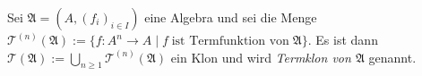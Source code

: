 \begin{definition}
    Sei $\mathfrak{A} = (A, (f_i)_{i \in I})$ eine Algebra und sei die Menge $\mathcal{T}^{(n)}(\mathfrak{A}) := \{f: A^n \to A\mid f\;\text{ist Termfunktion von}\;\mathfrak{A}\}$. Es ist dann $\mathcal{T}(\mathfrak{A}) := \bigcup_{n \ge 1} \mathcal{T}^{(n)}(\mathfrak{A})$ ein Klon und wird \emph{Termklon von $\mathfrak{A}$} genannt.
\end{definition}